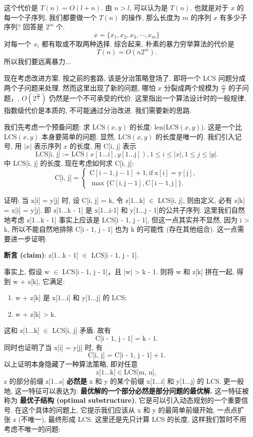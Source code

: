 \documentclass[a4paper]{ctexart}
\theoremstyle{definition}
\theoremstyle{definition}
\begin{document}
这个代价是 $T(n) = O(l + n)$. 由 $n > l$, 可以认为是 $T(n)$. 
也就是对于 $x$ 的每一个子序列, 我们都要做一个 $T(n)$ 的操作, 那么长度为 $m$ 的序列 $x$ 有多少子序列? 
回答是 $2^m$ 个.
$$
x = \{x_1, x_2, x_3, \cdots, x_m \}
$$
对每一个 $x_i$ 都有取或不取两种选择. 综合起来, 朴素的暴力穷举算法的代价是
$$
T(n) = O(n 2^m).
$$
所以我们要远离暴力...

现在考虑改进方案. 按之前的套路, 该是分治策略登场了. 
即将一个 LCS 问题分成两个子问题来处理. 然而这里出现了新的问题, 
哪怕 $x$ 分裂成两个规模为 $\frac{m}{2}$ 的子问题，, 
$O(2^{\frac{m}{2}})$ 仍然是一个不可承受的代价. 
这里指出一个算法设计时的一般规律, 指数级代价是本质的, 不可能通过分治改进. 
我们需要新的思路.

我们先考虑一个预备问题: 求 LCS$(x, y)$ 的长度: len(LCS$(x, y)$). 
这是一个比 LCS$(x, y)$ 本身要简单的问题. 显然, LCS$(x, y)$ 的长度是唯一的. 
我们引入记号, 用 $|x|$ 表示序列 $x$ 的长度, 用 C[i, j] 表示
$$
\mbox{LCS[i, j]} := \mbox{LCS}(x[1...\mathrm{i}], y[1...\mathrm{j}]), 
1 \leq i \leq |x|, 1 \leq j \leq |y|.
$$
中 LCS[i, j] 的长度. 现在考虑如何求 C[i, j]:
$$
\mbox{C[i, j]} = \left\{
\begin{array}{ll}
\mathrm{C[i - 1, j - 1] + 1}, \mathrm{if~x[i] = y[j]},\\
\max\{\mathrm{C[i, j - 1], C[i - 1, j]}\}.
\end{array}
\right.
$$

证明: 当 x[i] = y[j] 时, 设 C[i, j] = k, 令 z[1...k] $\in$ LCS[i, j], 
则由定义, 必有 z[k] = x[i] = y[j]. 即 z[1...k - 1] 是 x[1...i-1] 和 y[1...j - 1]的公共子序列. 
这里我们自然地考虑 z[1...k - 1] 事实上应该是 LCS[i - 1, j - 1], 
但这一点其实并不显然, 因为 i > k, 所以不能自然地排除 C[i - 1, j - 1] 
也为 k 的可能性 (存在其他组合). 这一点需要进一步证明:

\textbf{断言 (claim)}: z[1...k - 1] $\in$ LCS[i - 1, j - 1].

事实上, 假设 w $\in$ LCS[i - 1, j - 1]，且 |w| > k - 1. 
则将 w 和 z[k] 拼在一起, 得到 w + z[k], 它满足:
\begin{enumerate}
  \item w + z[k] 是 x[1...i] 和 y[1...j] 的 LCS;
  \item w + z[k] > k.
\end{enumerate}
这和 z[1...k] $\in$ LCS[i, j] 矛盾. 故有
$$
\mbox{C[i - 1, j - 1] = k - 1}.
$$
同时也证明了当 x[i] = y[j] 时, 有
$$
\mbox{C[i, j] = C[i - 1, j - 1]} + 1.
$$
以上证明本身隐藏了一种算法策略, 即对任意
$$
\mbox{z[1...k]} \in \mbox{LCS[m, n]},
$$
z 的部分前缀 z[1...s] \textbf{必然是} x 和 y 的某个前缀 x[1...i] 和 y[1...j] 的 LCS. 
更一般地, 这一特征可以表达为: \textbf{最优解的一个部分必然是部分问题的最优解.} 
这一特征被称为 \textbf{最优子结构 (optimal substructure)}, 
它是可以引入动态规划的一个重要信号. 在这个具体的问题上, 
它提示我们应该从 x 和 y 的最简单前缀开始, 一点点扩张 z (不唯一), 
最终形成 LCS. 这里还是先只计算 LCS 的长度, 这样我们暂时不用考虑不唯一的问题:
\end{document}
